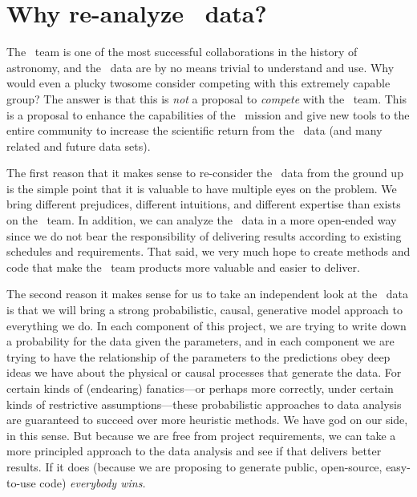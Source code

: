 \documentclass[letterpaper,12pt,preprint]{hack_aastex}
\begin{document}
\section{Why re-analyze \Kepler\ data?}

The \Kepler\ team is one of the most successful collaborations in the
history of astronomy, and the \Kepler\ data are by no means trivial to
understand and use.  Why would even a plucky twosome consider
competing with this extremely capable group?  The answer is that this
is \emph{not} a proposal to \emph{compete} with the \Kepler\ team.
This is a proposal to enhance the capabilities of the \Kepler\ mission
and give new tools to the entire community to increase the scientific
return from the \Kepler\ data (and many related and future data sets).

The first reason that it makes sense to re-consider the \Kepler\ data
from the ground up is the simple point that it is valuable to have
multiple eyes on the problem.  We bring different prejudices,
different intuitions, and different expertise than exists on the
\Kepler\ team.  In addition, we can analyze the \Kepler\ data in a
more open-ended way since we do not bear the responsibility of
delivering results according to existing schedules and requirements.
That said, we very much hope to create methods and code that make the
\Kepler\ team products more valuable and easier to deliver.

The second reason it makes sense for us to take an independent look at
the \Kepler\ data is that we will bring a strong probabilistic,
causal, generative model approach to everything we do.  In each
component of this project, we are trying to write down a probability
for the data given the parameters, and in each component we are trying
to have the relationship of the parameters to the predictions obey
deep ideas we have about the physical or causal processes that
generate the data.  For certain kinds of (endearing) fanatics---or
perhaps more correctly, under certain kinds of restrictive
assumptions---these probabilistic approaches to data analysis are
guaranteed to succeed over more heuristic methods.  We have god on our
side, in this sense.  But because we are free from project
requirements, we can take a more principled approach to the data
analysis and see if that delivers better results.  If it does (because
we are proposing to generate public, open-source, easy-to-use code)
\emph{everybody wins.}
\end{document}
